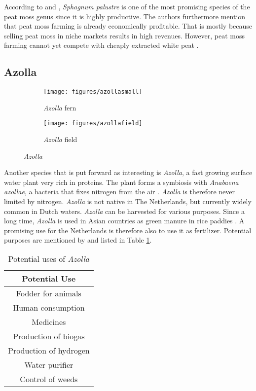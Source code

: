 \documentclass[a4paper,12pt]{scrbook}
\begin{document}
According to \citet{gaudig2014sphagnum} and \citet{wichtmann2016paludiculture}, \textit{Sphagnum palustre} is one of the most promising species of the peat moss genus since it is highly productive. The authors furthermore mention that peat moss farming is already economically profitable. That is mostly because selling peat moss in niche markets results in high revenues. However, peat moss farming cannot yet compete with cheaply extracted white peat \citep{gaudig2014sphagnum}.

\subsection{Azolla}

\begin{figure}
    \centering
    \begin{subfigure}[a]{0.3\textwidth}
    	\texttt{[image: figures/azollasmall]} 
    	\caption{ \textit{Azolla} fern}
    	\label{fig:azollasmall}
    \end{subfigure}	
    \quad
    \begin{subfigure}[a]{0.3\textwidth}
    	\texttt{[image: figures/azollafield]} 
    	\caption{ \textit{Azolla} field}
    	\label{fig:azollafield}
    \end{subfigure}	
    \caption{ \textit{Azolla} \citep{wagner1997azolla}}
    \label{fig:azolla}
\end{figure}

Another species that is put forward as interesting is \textit{Azolla}, a fast growing surface water plant very rich in proteins. The plant forms a symbiosis with \textit{Anabaena azollae}, a bacteria that fixes nitrogen from the air \citep{wagner1997azolla}. \textit{Azolla} is therefore never limited by nitrogen. \textit{Azolla} is not native in The Netherlands, but currently widely common in Dutch waters. \textit{Azolla} can be harvested for various purposes. Since a long time, \textit{Azolla} is used in Asian countries as green manure in rice paddies \citep{wagner1997azolla}. A promising use for the Netherlands is therefore also to use it as fertilizer. Potential purposes are mentioned by \citet{wagner1997azolla} and listed in Table \ref{tab:azolla}.

\begin{table}
\centering
\caption{Potential uses of \textit{Azolla}}
\begin{tabular}{|c|}
\hline 
\textbf{Potential Use} \\ 
\hline 
Fodder for animals \\ 
\hline 
Human consumption \\ 
\hline 
Medicines \\ 
\hline 
Production of biogas \\ 
\hline 
Production of hydrogen \\ 
\hline 
Water purifier \\ 
\hline 
Control of weeds \\ 
\hline 
\end{tabular} 
\label{tab:azolla}
\end{table}
\end{document}
